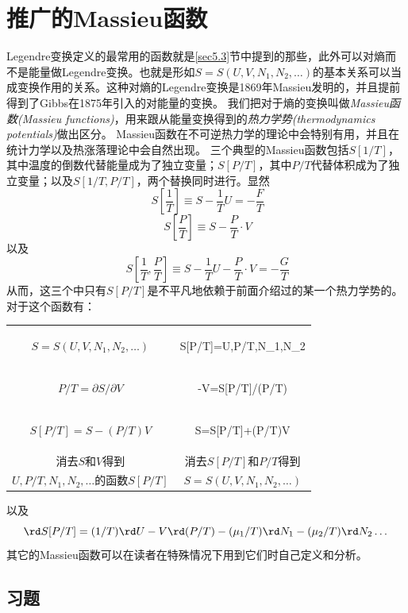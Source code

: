 \section{推广的Massieu函数}
\label{sec5.4}
Legendre变换定义的最常用的函数就是\ref{sec5.3}节中提到的那些，此外可以对熵而不是能量做Legendre变换。也就是形如$S=S(U,V,N_1,N_2,\dots)$的基本关系可以当成变换作用的关系。这种对熵的Legendre变换是1869年Massieu发明的，并且提前得到了Gibbs在1875年引入的对能量的变换。
我们把对于熵的变换叫做{\it Massieu函数(Massieu functions)}，用来跟从能量变换得到的{\it 热力学势(thermodynamics potentials)}做出区分。
Massieu函数在不可逆热力学的理论中会特别有用，并且在统计力学以及热涨落理论中会自然出现。
三个典型的Massieu函数包括$S[1/T]$，其中温度的倒数代替能量成为了独立变量；$S[P/T]$，其中$P/T$代替体积成为了独立变量；以及$S[1/T,P/T]$，两个替换同时进行。显然
\begin{equation}
\label{equ5.61}\
  S\left[\frac{1}{T}\right]\equiv S-\frac{1}{T}U=-\frac{F}{T}
\end{equation}
\begin{equation}
\label{equ5.62}\
  S\left[\frac{P}{T}\right]\equiv S-\frac{P}{T}\cdot V
\end{equation}
以及
\begin{equation}
\label{equ5.63}\
  S\left[\frac{1}{T},\frac{P}{T}\right]\equiv S-\frac{1}{T}U-\frac{P}{T}\cdot V=-\frac{G}{T}
\end{equation}
从而，这三个中只有$S[P/T]$是不平凡地依赖于前面介绍过的某一个热力学势的。
对于这个函数有：

\begin{tabular}{c|c}
\hline
$S=S(U,V,N_1,N_2,\dots) $& \begin{mymath}S[P/T]=U,P/T,N_1,N_2\text{的函数}\label{equ5.64}\end{mymath}\\
$P/T=\partial S/\partial V $& \begin{mymath}-V=\partial S[P/T]/\partial(P/T)\label{equ5.65} \end{mymath}\\
$S[P/T]=S-(P/T)V $& \begin{mymath}S=S[P/T]+(P/T)V \label{equ5.66} \end{mymath}\\
消去$S$和$V$得到 & 消去$S[P/T]$和$P/T$得到\\
$U,P/T,N_1,N_2,\dots$的函数$S[P/T]$ & $S=S(U,V,N_1,N_2,\dots)$ \\
\hline
\end{tabular}

以及
\begin{equation}
\label{equ5.67}
	\rd S[P/T]=(1/T) \rd U-V \rd (P/T)-(\mu_1/T) \rd N_1-(\mu_2/T) \rd N_2\dots
\end{equation}
其它的Massieu函数可以在读者在特殊情况下用到它们时自己定义和分析。

\subsection*{习题}
